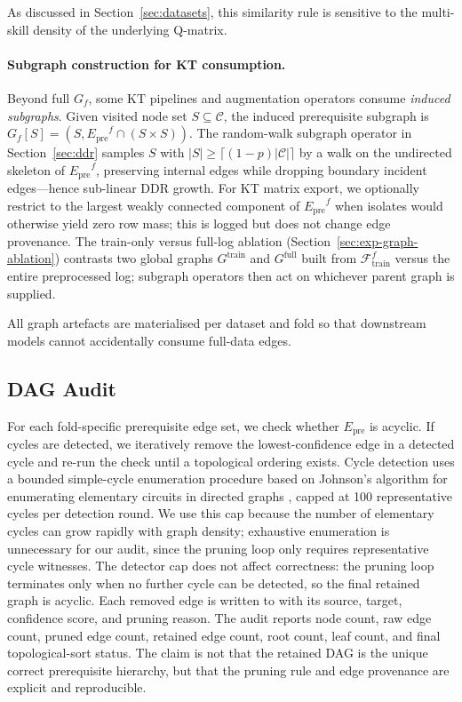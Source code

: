 \documentclass[pdflatex,sn-basic]{sn-jnl}
\newcommand{\Epre}{\ensuremath{E_{\text{pre}}}}
\newcommand{\DDR}{\textsc{DDR}}
\begin{document}
As discussed in Section~\ref{sec:datasets}, this similarity rule is
sensitive to the multi-skill density of the underlying Q-matrix.

\paragraph{Subgraph construction for KT consumption.}
\label{sec:subgraph}
Beyond full $G_f$, some KT pipelines and augmentation operators consume
\emph{induced subgraphs}. Given visited node set $S\subseteq\mathcal{C}$,
the induced prerequisite subgraph is
$G_f[S]=(S,\Epre^f\cap(S\times S))$.
The random-walk subgraph operator in Section~\ref{sec:ddr} samples $S$
with $|S|\ge\lceil(1-p)|\mathcal{C}|\rceil$ by a walk on the undirected
skeleton of $\Epre^f$, preserving internal edges while dropping boundary
incident edges---hence sub-linear \DDR{} growth.
For KT matrix export, we optionally restrict to the largest weakly
connected component of $\Epre^f$ when isolates would otherwise yield zero
row mass; this is logged but does not change edge provenance.
The train-only versus full-log ablation (Section~\ref{sec:exp-graph-ablation})
contrasts two global graphs $G^{\text{train}}$ and $G^{\text{full}}$ built
from $\mathcal{F}_{\text{train}}^f$ versus the entire preprocessed log;
subgraph operators then act on whichever parent graph is supplied.

All graph artefacts are materialised per dataset and fold so that
downstream models cannot accidentally consume full-data edges.
\subsection{DAG Audit}
\label{sec:dag-audit}
For each fold-specific prerequisite edge set, we check whether $\Epre$
is acyclic. If cycles are detected, we iteratively remove the
lowest-confidence edge in a detected cycle and re-run the check until a
topological ordering exists. Cycle detection uses a bounded simple-cycle enumeration procedure based on
Johnson's algorithm for enumerating elementary circuits in directed graphs \cite{johnson1975finding}, capped at 100 representative cycles per detection round. We use this cap because the number of elementary cycles can grow rapidly with graph density; exhaustive enumeration is unnecessary for our
audit, since the pruning loop only requires representative cycle witnesses. The detector cap does not affect
correctness: the pruning loop terminates only when no further cycle can
be detected, so the final retained graph is acyclic. Each removed edge
is written to
 with its source,
target, confidence score, and pruning reason. The audit reports node
count, raw edge count, pruned edge count, retained edge count, root
count, leaf count, and final topological-sort status. The claim is not
that the retained DAG is the unique correct prerequisite hierarchy, but
that the pruning rule and edge provenance are explicit and reproducible.
\end{document}
